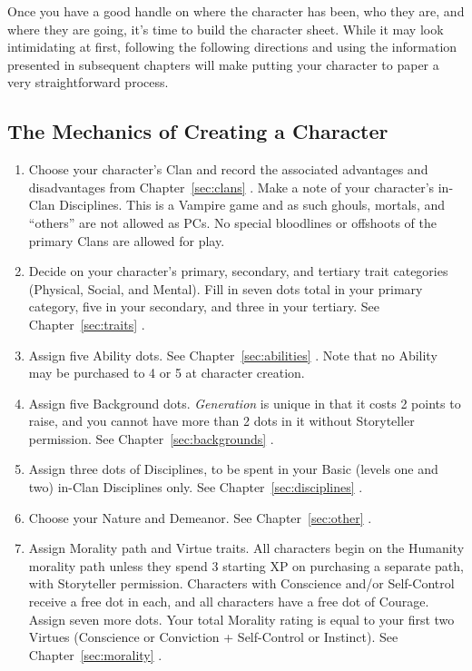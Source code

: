 Once you have a good handle on where the character has been, who they are, and where they 
are going, it's time to build the character sheet.  While it may look intimidating at first, 
following the following directions and using the information presented in subsequent chapters 
will make putting your character to paper a very straightforward process.

\subsection{The Mechanics of Creating a Character}
\begin{enumerate}
	\item Choose your character's Clan and record the associated advantages and disadvantages 
	from Chapter~\ref{sec:clans} .  Make a note of your character's in-Clan Disciplines.  
	This is a Vampire game and as such ghouls, mortals, and ``others'' are not allowed as PCs.  
	No special bloodlines or offshoots of the primary Clans are allowed for play.
	\item Decide on your character's primary, secondary, and tertiary trait categories 
	(Physical, Social, and Mental).  Fill in seven dots total in your primary category, 
	five in your secondary, and three in your tertiary.  See Chapter~\ref{sec:traits} .
	\item Assign five Ability dots.  See Chapter~\ref{sec:abilities} .  Note that no Ability 
	may be purchased to 4 or 5 at character creation.
	\item Assign five Background dots.  \emph{Generation} is unique in that it costs 
	2 points to raise, and you cannot have more than 2 dots in it without Storyteller 
	permission.  See Chapter~\ref{sec:backgrounds} .
	\item Assign three dots of Disciplines, to be spent in your Basic (levels one and 
	two) in-Clan Disciplines only.  See Chapter~\ref{sec:disciplines} .
	\item Choose your Nature and Demeanor.  See Chapter~\ref{sec:other} .
	\item Assign Morality path and Virtue traits.  All characters begin on the 
	Humanity morality path unless they spend 3 starting XP on purchasing a separate 
	path, with Storyteller permission.  Characters with Conscience and/or Self-Control 
	receive a free dot in each, and all characters have a free dot of Courage.  Assign 
	seven more dots.  Your total Morality rating is equal to your first two Virtues 
	(Conscience or Conviction + Self-Control or Instinct).  See Chapter~\ref{sec:morality} .

\end{enumerate}
